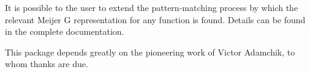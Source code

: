 It is possible to the user to extend the pattern-matching process by
which the relevant Meijer G representation for any function is found.
Details can be found in the complete documentation.

This package depends greatly on the pioneering work of Victor
Adamchik, to whom thanks are due.

